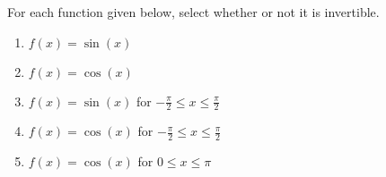 \documentclass{ximera}
\author{Kenneth Berglund}
\begin{document}
\begin{exercise}
For each function given below, select whether or not it is invertible.
\begin{enumerate}
\item $f(x) = \sin(x)$ 
\begin{multipleChoice}  
\end{multipleChoice} 

\item $f(x) = \cos(x)$ 
\begin{multipleChoice}  
\end{multipleChoice} 

\item $f(x) = \sin(x)$ for $-\frac{\pi}{2} \le x \le \frac{\pi}{2}$ 
\begin{multipleChoice}  
\end{multipleChoice} 

\item $f(x) = \cos(x)$ for $-\frac{\pi}{2} \le x \le \frac{\pi}{2}$ 
\begin{multipleChoice}  
\end{multipleChoice} 

\item $f(x) = \cos(x)$ for $0 \le x \le \pi$ 
\begin{multipleChoice}  
\end{multipleChoice} 

\end{enumerate}
\end{exercise}
\end{document}
